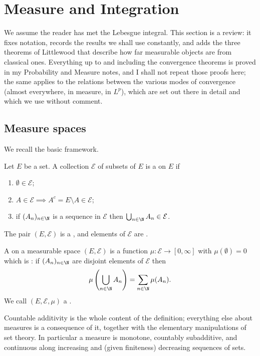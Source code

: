 \section{Measure and Integration}\label{sec:measure}

We assume the reader has met the Lebesgue integral. This section is a review: it fixes notation, records the results we shall use constantly, and adds the three theorems of Littlewood that describe how far measurable objects are from classical ones. Everything up to and including the convergence theorems is proved in my Probability and Measure notes, and I shall not repeat those proofs here; the same applies to the relations between the various modes of convergence (almost everywhere, in measure, in $L^p$), which are set out there in detail and which we use without comment.

\subsection{Measure spaces}

We recall the basic framework.

\begin{definition}
	Let $E$ be a set. A collection $\mathcal{E}$ of subsets of $E$ is a  on $E$ if
	\begin{enumerate}[label=(\roman*)]
		\item $\emptyset \in \mathcal{E}$;
		\item $A \in \mathcal{E} \implies A^c = E \setminus A \in \mathcal{E}$;
		\item if $(A_n)_{n \in \N}$ is a sequence in $\mathcal{E}$ then $\bigcup_{n \in \N} A_n \in \mathcal{E}$.
	\end{enumerate}
	The pair $(E, \mathcal{E})$ is a , and elements of $\mathcal{E}$ are .
\end{definition}

\begin{definition}[Measure]
	A  on a measurable space $(E, \mathcal{E})$ is a function $\mu : \mathcal{E} \to [0, \infty]$ with $\mu(\emptyset) = 0$ which is : if $(A_n)_{n \in \N}$ are disjoint elements of $\mathcal{E}$ then
	$$\mu\left( \bigcup_{n \in \N} A_n \right) = \sum_{n \in \N} \mu(A_n).$$
	We call $(E, \mathcal{E}, \mu)$ a .
\end{definition}

Countable additivity is the whole content of the definition; everything else about measures is a consequence of it, together with the elementary manipulations of set theory. In particular a measure is monotone, countably subadditive, and continuous along increasing and (given finiteness) decreasing sequences of sets.

